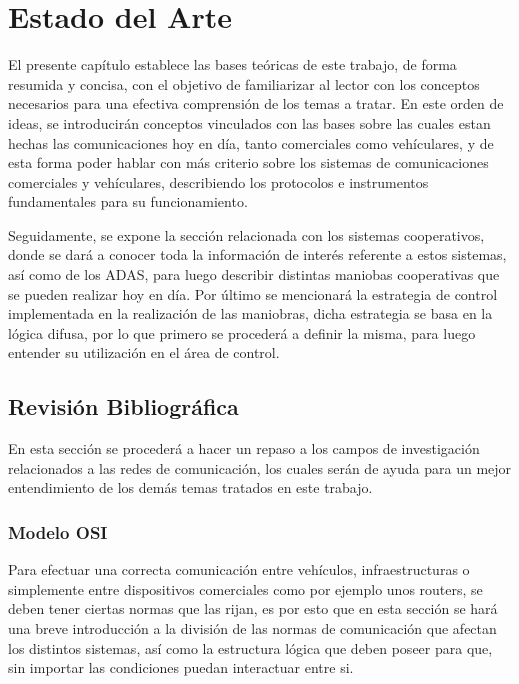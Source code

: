 \chapter{Estado del Arte}\label{sec:capitulo3}
\thispagestyle{empty}
El presente capítulo establece las bases teóricas de este trabajo, de forma resumida y concisa, con el objetivo de familiarizar al lector con los conceptos necesarios para una efectiva comprensión de los temas a tratar. En este orden de ideas, se introducirán conceptos vinculados con las bases sobre las cuales estan hechas las comunicaciones hoy en día, tanto comerciales como vehículares, y de esta forma poder hablar con más criterio sobre los sistemas de comunicaciones comerciales y vehículares, describiendo los protocolos e instrumentos fundamentales para su funcionamiento.\\

\par Seguidamente, se expone la sección relacionada con los sistemas cooperativos, donde se dará a conocer toda la información de interés referente a estos sistemas, así como de los ADAS, para luego describir distintas maniobas cooperativas que se pueden realizar hoy en día. Por último se mencionará la estrategia de control implementada en la realización de las maniobras, dicha estrategia se basa en la lógica difusa, por lo que primero se procederá a definir la misma, para luego entender su utilización en el área de control.\\  
    
\section{Revisión Bibliográfica}

En esta sección se procederá a hacer un repaso a los campos de investigación relacionados a las redes de comunicación, los cuales serán de ayuda para un mejor entendimiento de los demás temas tratados en este trabajo.

\subsection{Modelo OSI}

Para efectuar una correcta comunicación entre vehículos, infraestructuras o simplemente entre dispositivos comerciales como por ejemplo unos routers, se deben tener ciertas normas que las rijan, es por esto que en esta sección se hará una breve introducción a la división de las normas de comunicación que afectan los distintos sistemas, así como la estructura lógica que deben poseer para que, sin importar las condiciones puedan interactuar entre si.\\


